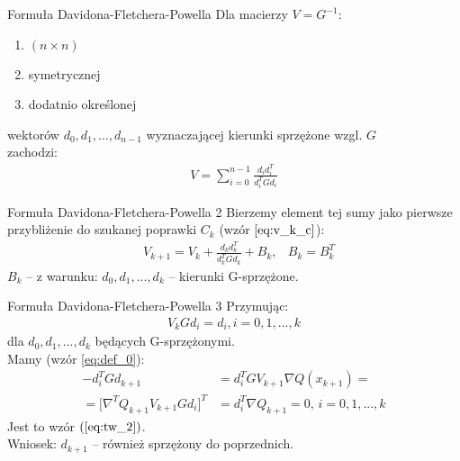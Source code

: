  \begin{frame}{Formuła Davidona-Fletchera-Powella}
      Dla macierzy $V = G^{-1}$:\\
      \begin{enumerate}
        \item $(n \times n)$\\
        \item symetrycznej\\
        \item dodatnio określonej
      \end{enumerate}
      wektorów $d_0, d_1, ..., d_{n - 1}$ wyznaczającej kierunki sprzężone wzgl. $G$\\
      zachodzi:
      \begin{equation}
        \begin{aligned}
          V = \sum_{i = 0}^{n - 1} \frac{d_i d_i^T}{d_i^T G d_i}
        \end{aligned}
      \end{equation}
  \end{frame}

  \begin{frame}{Formuła Davidona-Fletchera-Powella 2}
    Bierzemy element tej sumy jako pierwsze przybliżenie do szukanej
    poprawki $C_k$ (wzór $\ref{eq:v_k_c}$):
    \begin{equation}\label{eq:v_k1_k}
      \begin{aligned}
        &V_{k + 1} = V_k + \frac{d_k d_k^T}{d_k^T G d_k} + B_k, &B_k = B_k^T
      \end{aligned}
    \end{equation}
    $B_k$ -- z warunku: $d_0, d_1, ..., d_k$ -- kierunki G-sprzężone.
  \end{frame}


  \begin{frame}{Formuła Davidona-Fletchera-Powella 3}
    Przymując:
    \begin{equation*}
      \begin{aligned}
        V_k G d_i = d_i, i = 0, 1, ..., k
      \end{aligned}
    \end{equation*}
    dla $d_0, d_1, ..., d_k$ będących G-sprzężonymi.\\
    Mamy (wzór \ref{eq:def_0}):
    \begin{equation*}
      \begin{aligned}
        -d_i^T G d_{k + 1} &= d_i^T G V_{k + 1} \nabla Q(x_{k + 1}) =\\
        = \bigg[ \nabla^T Q_{k + 1} V_{k + 1} G d_i \bigg]^T
        &= d_i^T \nabla Q_{k + 1} = 0 \text{, } i = 0, 1, ..., k
      \end{aligned}
    \end{equation*}
    Jest to wzór $(\ref{eq:tw_2})$.\\
    Wniosek: $d_{k + 1}$ -- również sprzężony do poprzednich.
  \end{frame}

